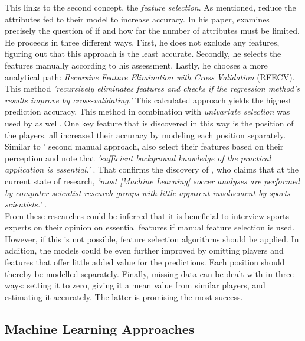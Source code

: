 \indent This links to the second concept, the \emph{feature selection}. As mentioned, \citet{deng_analysis_2020,egidi_bayesian_2018} reduce the attributes fed to their model to increase accuracy. In his paper, \citet{lutz_fantasy_2015} examines precisely the question of if and how far the number of attributes must be limited. He proceeds in three different ways. First, he does not exclude any features, figuring out that this approach is the least accurate. Secondly, he selects the features manually according to his assessment. Lastly, he chooses a more analytical path: \emph{Recursive Feature Elimination with Cross Validation} (RFECV). This method \emph{'recursively eliminates features and checks if the regression method's results improve by cross-validating.'} \parencite[, p. 4]{lutz_fantasy_2015} This calculated approach yields the highest prediction accuracy. This method in combination with \emph{univariate selection} was used by \citet{anik_players_2018} as well. One key feature that is discovered in this way is the position of the players. \citet{lutz_fantasy_2015,demediuk_performance_2021,egidi_bayesian_2018} all increased their accuracy by modeling each position separately. Similar to \citeauthor{lutz_fantasy_2015}' second manual approach, \citeauthor{deng_analysis_2020} also select their features based on their perception and note that \emph{'sufficient background knowledge of the practical application is essential.'} \parencite[, p. 4]{deng_analysis_2020}. That confirms the discovery of \citeauthor{rein_big_2016}, who claims that at the current state of research, \emph{'most [Machine Learning] soccer analyses are performed by computer scientist research groups with little apparent involvement by sports scientists.'} \parencite[, p. 6]{rein_big_2016}. \\
\indent From these researches could be inferred that it is beneficial to interview sports experts on their opinion on essential features if manual feature selection is used. However, if this is not possible, feature selection algorithms should be applied. In addition, the models could be even further improved by omitting players and features that offer little added value for the predictions. Each position should thereby be modelled separately. Finally, missing data can be dealt with in three ways: setting it to zero, giving it a mean value from similar players, and estimating it accurately. The latter is promising the most success.

\clearpage \subsection{Machine Learning Approaches}

